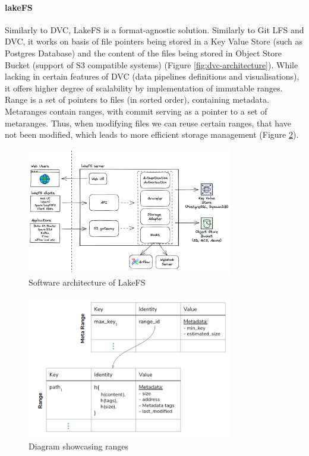 \paragraph{lakeFS}
\cite{lakefs}
Similarly to DVC, LakeFS is a format-agnostic solution. Similarly to Git LFS and
DVC, it works on basis of file pointers being stored in a Key Value Store (such
as Postgres Database) and the content of the files being stored in Object Store
Bucket (support of S3 compatible systems) (Figure
\ref{fig:dvc-architecture})\cite{architecture-lakefs}. While lacking in certain
features of DVC (data pipelines definitions and visualisations), it offers
higher degree of scalability by implementation of immutable ranges. Range is a
set of pointers to files (in sorted order), containing metadata. Metaranges
contain ranges, with commit serving as a pointer to a set of metaranges. Thus,
when modifying files we can reuse certain ranges, that have not been modified,
which leads to more efficient storage management (Figure
\ref{fig:lakefs-ranges}). 

\begin{figure}[H]
    \centering
    \includegraphics[width=0.8\textwidth]{fig/lakefs-arch.png}
    \caption{Software architecture of LakeFS \cite{architecture-lakefs}}
    \label{fig:lakefs-architecture}
\end{figure}

\begin{figure}[H]
    \centering
    \includegraphics[width=0.8\textwidth]{fig/graveler2.png}
    \caption{Diagram showcasing ranges \cite{architecture-lakefs}}
    \label{fig:lakefs-ranges}
\end{figure}


